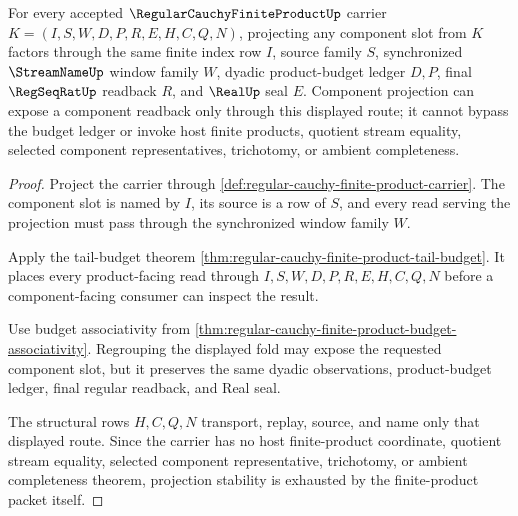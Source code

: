 \begin{theorem}\label{thm:regular-cauchy-finite-product-projection-stability}
For every accepted $\RegularCauchyFiniteProductUp$ carrier $K=(I,S,W,D,P,R,E,H,C,Q,N)$, projecting any component slot from $K$ factors through the same finite index row $I$, source family $S$, synchronized $\StreamNameUp$ window family $W$, dyadic product-budget ledger $D,P$, final $\RegSeqRatUp$ readback $R$, and $\RealUp$ seal $E$. Component projection can expose a component readback only through this displayed route; it cannot bypass the budget ledger or invoke host finite products, quotient stream equality, selected component representatives, trichotomy, or ambient completeness.
\end{theorem}
\begin{proof}
Project the carrier through \autoref{def:regular-cauchy-finite-product-carrier}. The component slot is named by $I$, its source is a row of $S$, and every read serving the projection must pass through the synchronized window family $W$.

Apply the tail-budget theorem \autoref{thm:regular-cauchy-finite-product-tail-budget}. It places every product-facing read through $I,S,W,D,P,R,E,H,C,Q,N$ before a component-facing consumer can inspect the result.

Use budget associativity from \autoref{thm:regular-cauchy-finite-product-budget-associativity}. Regrouping the displayed fold may expose the requested component slot, but it preserves the same dyadic observations, product-budget ledger, final regular readback, and Real seal.

The structural rows $H,C,Q,N$ transport, replay, source, and name only that displayed route. Since the carrier has no host finite-product coordinate, quotient stream equality, selected component representative, trichotomy, or ambient completeness theorem, projection stability is exhausted by the finite-product packet itself.
\end{proof}

